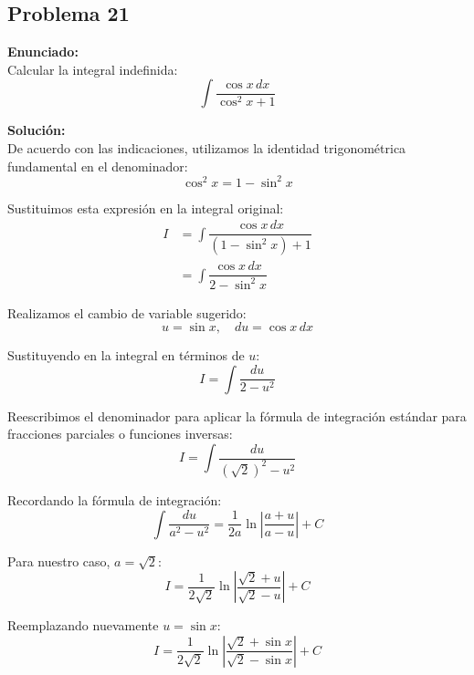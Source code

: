\subsection*{Problema 21}

\textbf{Enunciado:} \\
Calcular la integral indefinida:
\begin{equation*}
\int \dfrac{\cos x \, dx}{\cos^2 x + 1}
\end{equation*}

\textbf{Solución:} \\
De acuerdo con las indicaciones, utilizamos la identidad trigonométrica fundamental en el denominador:
\begin{equation*}
\cos^2 x = 1 - \sin^2 x
\end{equation*}

Sustituimos esta expresión en la integral original:
\begin{align*}
I &= \int \dfrac{\cos x \, dx}{(1 - \sin^2 x) + 1} \\
  &= \int \dfrac{\cos x \, dx}{2 - \sin^2 x}
\end{align*}

Realizamos el cambio de variable sugerido:
\begin{equation*}
u = \sin x, \quad du = \cos x \, dx
\end{equation*}

Sustituyendo en la integral en términos de $u$:
\begin{equation*}
I = \int \dfrac{du}{2 - u^2}
\end{equation*}

Reescribimos el denominador para aplicar la fórmula de integración estándar para fracciones parciales o funciones inversas:
\begin{equation*}
I = \int \dfrac{du}{(\sqrt{2})^2 - u^2}
\end{equation*}

Recordando la fórmula de integración:
\begin{equation*}
\int \dfrac{du}{a^2 - u^2} = \dfrac{1}{2a} \ln \left| \dfrac{a + u}{a - u} \right| + C
\end{equation*}

Para nuestro caso, $a = \sqrt{2}$:
\begin{equation*}
I = \dfrac{1}{2\sqrt{2}} \ln \left| \dfrac{\sqrt{2} + u}{\sqrt{2} - u} \right| + C
\end{equation*}

Reemplazando nuevamente $u = \sin x$:
\begin{equation*}
I = \dfrac{1}{2\sqrt{2}} \ln \left| \dfrac{\sqrt{2} + \sin x}{\sqrt{2} - \sin x} \right| + C
\end{equation*}

